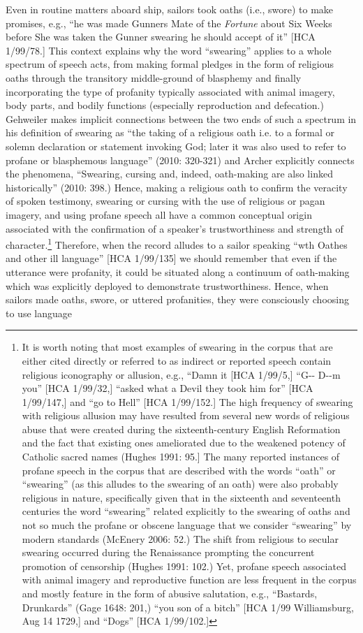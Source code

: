\begin{styleStandard}
Even in routine matters aboard ship, sailors took oaths (i.e., swore) to make promises, e.g., “he was made Gunners Mate of the \textit{Fortune }about Six Weeks before She was taken the Gunner swearing he should accept of it” [HCA 1/99/78.] This context explains why the word “swearing” applies to a whole spectrum of speech acts, from making formal pledges in the form of religious oaths through the transitory middle-ground of blasphemy and finally incorporating the type of profanity typically associated with animal imagery, body parts, and bodily functions (especially reproduction and defecation.) Gehweiler makes implicit connections between the two ends of such a spectrum in his definition of swearing as “the taking of a religious oath i.e. to a formal or solemn declaration or statement invoking God; later it was also used to refer to profane or blasphemous language” (2010: 320-321) and Archer explicitly connects the phenomena, “Swearing, cursing and, indeed, oath-making are also linked historically” (2010: 398.) Hence, making a religious oath to confirm the veracity of spoken testimony, swearing or cursing with the use of religious or pagan imagery, and using profane speech all have a common conceptual origin associated with the confirmation of a speaker’s trustworthiness and strength of character.\footnote{ It is worth noting that most examples of swearing in the corpus that are either cited directly or referred to as indirect or reported speech contain religious iconography or allusion, e.g., “Damn it [HCA 1/99/5,] “G-{}- D-{}-m you” [HCA 1/99/32,] “asked what a Devil they took him for” [HCA 1/99/147,] and “go to Hell” [HCA 1/99/152.] The high frequency of swearing with religious allusion may have resulted from several new words of religious abuse that were created during the sixteenth-century English Reformation and the fact that existing ones ameliorated due to the weakened potency of Catholic sacred names (Hughes 1991: 95.] The many reported instances of profane speech in the corpus that are described with the words “oath” or “swearing” (as this alludes to the swearing of an oath) were also probably religious in nature, specifically given that in the sixteenth and seventeenth centuries the word “swearing” related explicitly to the swearing of oaths and not so much the profane or obscene language that we consider “swearing” by modern standards (McEnery 2006: 52.) The shift from religious to secular swearing occurred during the Renaissance prompting the concurrent promotion of censorship (Hughes 1991: 102.) Yet, profane speech associated with animal imagery and reproductive function are less frequent in the corpus and mostly feature in the form of abusive salutation, e.g., “Bastards, Drunkards” (Gage 1648: 201,) “you son of a bitch” [HCA 1/99 Williamsburg, Aug 14 1729,] and “Dogs” [HCA 1/99/102.] } Therefore, when the record alludes to a sailor speaking “wth Oathes and other ill language” [HCA 1/99/135] we should remember that even if the utterance were profanity, it could be situated along a continuum of oath-making which was explicitly deployed to demonstrate trustworthiness. Hence, when sailors made oaths, swore, or uttered profanities, they were consciously choosing to use language 
\end{styleStandard}
